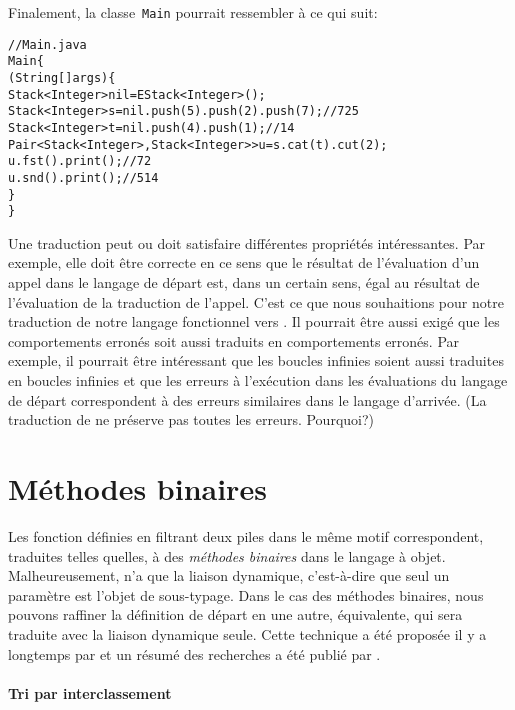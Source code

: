 Finalement, la classe~\texttt{Main} pourrait ressembler à ce qui suit:
\begin{alltt}
// Main.java
\public \class Main \{
  \public \static \void \main (String[] args) \{
    Stack<Integer> nil = \new EStack<Integer>();
    Stack<Integer> s = nil.push(5).push(2).push(7);\hfill// 7 2 5
    Stack<Integer> t = nil.push(4).push(1);\hfill// 1 4
    Pair<Stack<Integer>,Stack<Integer>> u = s.cat(t).cut(2);
    u.fst().print();\hfill// 7 2
    u.snd().print();\hfill// 5 1 4
  \}
\}
\end{alltt}
Une traduction peut ou doit satisfaire différentes propriétés
intéressantes. Par exemple, elle doit être correcte en ce sens que le
résultat de l'évaluation d'un appel dans le langage de départ est,
dans un certain sens, égal au résultat de l'évaluation de la
traduction de l'appel. C'est ce que nous souhaitions pour notre
traduction de notre langage fonctionnel vers \Java. Il pourrait être
aussi exigé que les comportements erronés soit aussi traduits en
comportements erronés. Par exemple, il pourrait être intéressant que
les boucles infinies soient aussi traduites en boucles infinies et que
les erreurs à l'exécution dans les évaluations du langage de départ
correspondent à des erreurs similaires dans le langage d'arrivée. (La
traduction de  ne préserve pas toutes les
erreurs. Pourquoi?)


\section{Méthodes binaires}

Les fonction définies en filtrant deux piles dans le même motif
correspondent, traduites telles quelles, à des \emph{méthodes
  binaires} dans le langage à objet. Malheureusement, \Java n'a que la
liaison dynamique, c'est-à-dire que seul un paramètre est l'objet de
sous-typage. Dans le cas des méthodes binaires,
 nous pouvons raffiner la définition
de départ en une autre, équivalente, qui sera traduite avec la liaison
dynamique seule. Cette technique a été proposée il y a longtemps par
\cite{Ingalls_1986} et un résumé des recherches a été publié par
\cite{MuscheviciPotaninTemperoNoble_2008}.

\paragraph{Tri par interclassement}

